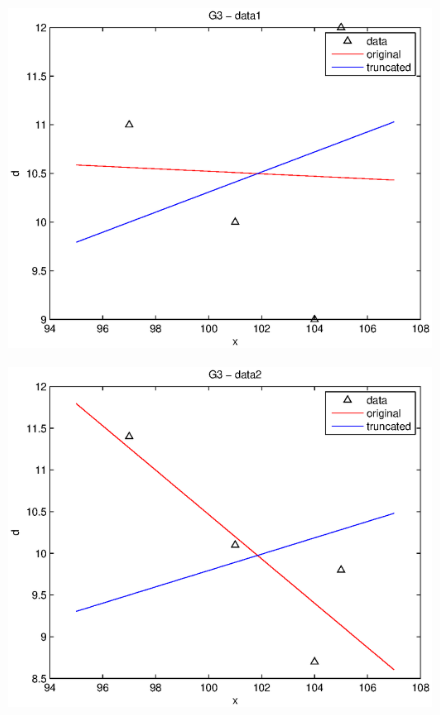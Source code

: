 \documentclass[11pt]{article}
\begin{document}
\begin{figure}
\begin{center}
  \includegraphics[width=12cm]{p2fig3.eps}
  \end{center}
\end{figure}
  \begin{figure}
\begin{center}
  \includegraphics[width=12cm]{p2fig4.eps}
  \end{center}
\end{figure}
\end{document}
